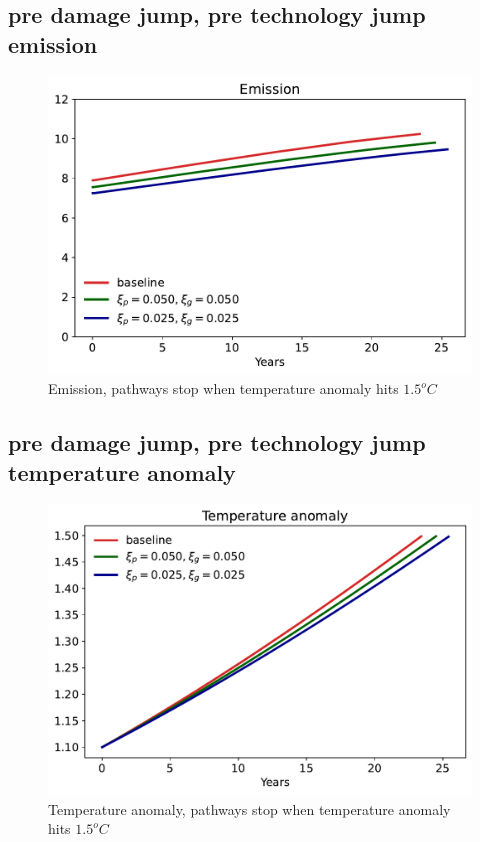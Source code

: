 \documentclass[12pt]{article}
\begin{document}
\subsection{pre damage jump, pre technology jump emission}
\begin{figure}[H]
	\centering
	\includegraphics[width=\textwidth]{../figures/xi_comparison/20damage/Et_1p5.pdf}
	\caption{Emission, pathways stop when temperature anomaly hits $1.5^o C$}
\end{figure}

\subsection{pre damage jump, pre technology jump temperature anomaly}
\begin{figure}[H]
	\centering
	\includegraphics[width=\textwidth]{../figures/xi_comparison/20damage/Yt_1p5.pdf}
	\caption{Temperature anomaly, pathways stop when temperature anomaly hits $1.5^o C$}
\end{figure}
\end{document}
